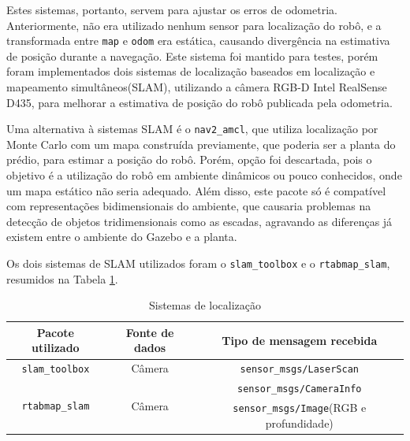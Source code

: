 \documentclass[repeatfields,xlists,xpacks,oneside,yearsonly]{ufrgscca}
\begin{document}
Estes sistemas, portanto, servem para ajustar os erros de odometria.
Anteriormente, não era utilizado nenhum sensor para localização do
robô, e a transformada entre \texttt{map} e \texttt{odom} era
estática, causando divergência na estimativa de posição durante a
navegação. Este sistema foi mantido para testes, porém foram
implementados dois sistemas de localização baseados em localização e
mapeamento simultâneos(SLAM), utilizando a câmera RGB-D Intel
RealSense D435, para melhorar a estimativa de posição do robô
publicada pela odometria.

Uma alternativa à sistemas SLAM é o \texttt{nav2\_amcl}, que utiliza
localização por Monte Carlo com um mapa construída previamente, que
poderia ser a planta do prédio, para estimar a posição do robô.
Porém, opção foi descartada, pois o objetivo é a utilização do robô
em ambiente dinâmicos ou pouco conhecidos, onde um mapa estático não
seria adequado. Além disso, este pacote só é compatível com
representações bidimensionais do ambiente, que causaria problemas na
detecção de objetos tridimensionais como as escadas, agravando as
diferenças já existem entre o ambiente do Gazebo e a planta.

Os dois sistemas de SLAM utilizados foram o \texttt{slam\_toolbox} e
o \texttt{rtabmap\_slam}, resumidos na Tabela \ref{tab:localizacao}.

\begin{table}[h]
    \begin{center}
        \caption{Sistemas de localização}
        \label{tab:localizacao}
        \begin{tabular}{c|c|c}
            Pacote utilizado                        & Fonte de dados          & Tipo de mensagem recebida                       \\
            \hline
            \texttt{slam\_toolbox}                  & Câmera                  & \texttt{sensor\_msgs/LaserScan}                 \\
            \hline
            \multirow{2}{*}{\texttt{rtabmap\_slam}} & \multirow{2}{*}{Câmera} & \texttt{sensor\_msgs/CameraInfo}                \\
                                                    &                         & \texttt{sensor\_msgs/Image}(RGB e profundidade) \\
            \hline
        \end{tabular}
    \end{center}
\end{table}
\end{document}
